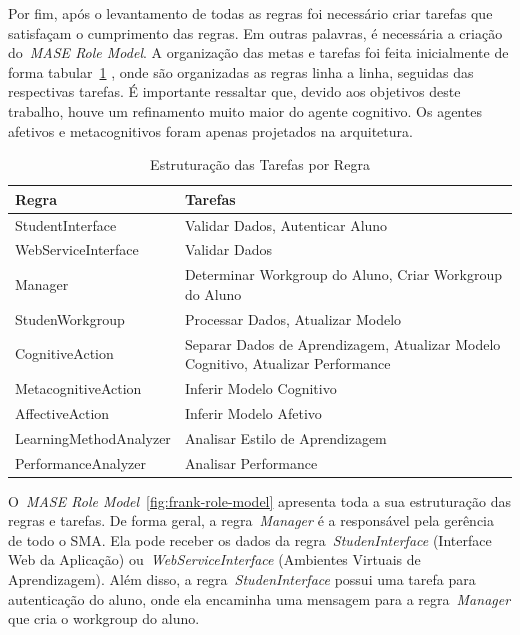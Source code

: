 Por fim, após o levantamento de todas as regras foi necessário criar tarefas que satisfaçam o cumprimento das regras. Em outras palavras, é necessária a criação do~\emph{MASE Role Model}. A organização das metas e tarefas foi feita inicialmente de forma tabular~\ref{tabela:mase-role-model} , onde são organizadas as regras linha a linha, seguidas das respectivas tarefas. É importante ressaltar que, devido aos objetivos deste trabalho, houve um refinamento muito maior do agente cognitivo. Os agentes afetivos e metacognitivos foram apenas projetados na arquitetura.

\begin{table}
	\caption{Estruturação das Tarefas por Regra}
	\begin{tabular}{|p{5cm} | p{9cm}|}
		\hline
		\textbf{Regra}		& \textbf{Tarefas} \\
		\hline
		StudentInterface 	& Validar Dados, Autenticar Aluno  \\
		\hline
		WebServiceInterface 	& Validar Dados  \\
		\hline
		Manager 		& Determinar Workgroup do Aluno, Criar Workgroup do Aluno  \\ %
		\hline
		StudenWorkgroup 	& Processar Dados, Atualizar Modelo   \\
		\hline
		CognitiveAction 	& Separar Dados de Aprendizagem, Atualizar Modelo Cognitivo, Atualizar Performance  \\
		\hline
		MetacognitiveAction 	& Inferir Modelo Cognitivo  \\
		\hline
		AffectiveAction 	& Inferir Modelo Afetivo  \\
		\hline
		LearningMethodAnalyzer 	& Analisar Estilo de Aprendizagem  \\
		\hline
		PerformanceAnalyzer 	& Analisar Performance  \\
		\hline
	\end{tabular}
	\label{tabela:mase-role-model}
\end{table}

O~\emph{MASE Role Model}~\ref{fig:frank-role-model} apresenta toda a sua estruturação das regras e tarefas. De forma geral, a regra~\emph{Manager} é a responsável pela gerência de todo o SMA. Ela pode receber os dados da regra~\emph{StudenInterface} (Interface Web da Aplicação) ou~\emph{WebServiceInterface} (Ambientes Virtuais de Aprendizagem). Além disso, a regra~\emph{StudenInterface} possui uma tarefa para autenticação do aluno, onde ela encaminha uma mensagem para a regra~\emph{Manager} que cria o workgroup do aluno.

